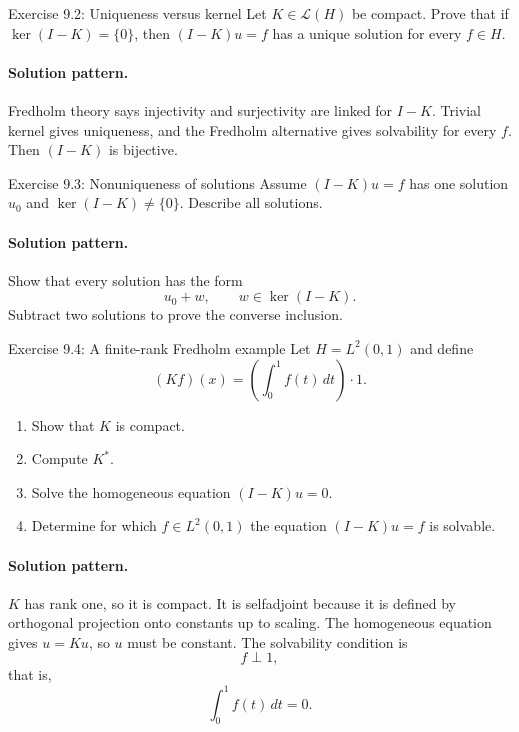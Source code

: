 \documentclass[header={Lecture 9 Exam Study Notes}]{study-note}
\begin{document}
\begin{exbox}{Exercise 9.2: Uniqueness versus kernel}
Let $K\in\mathcal L(H)$ be compact. Prove that if $\ker(I-K)=\{0\}$, then $(I-K)u=f$ has a unique solution for every $f\in H$.

\paragraph{Solution pattern.}
Fredholm theory says injectivity and surjectivity are linked for $I-K$. Trivial kernel gives uniqueness, and the Fredholm alternative gives solvability for every $f$. Then $(I-K)$ is bijective.
\end{exbox}

\begin{exbox}{Exercise 9.3: Nonuniqueness of solutions}
Assume $(I-K)u=f$ has one solution $u_0$ and $\ker(I-K)\neq\{0\}$. Describe all solutions.

\paragraph{Solution pattern.}
Show that every solution has the form
\[
u_0+w,
\qquad w\in\ker(I-K).
\]
Subtract two solutions to prove the converse inclusion.
\end{exbox}

\begin{exbox}{Exercise 9.4: A finite-rank Fredholm example}
Let $H=L^2(0,1)$ and define
\[
(Kf)(x)=\left(\int_0^1 f(t)\,dt\right)\cdot 1.
\]
\begin{enumerate}
\item Show that $K$ is compact.
\item Compute $K^*$.
\item Solve the homogeneous equation $(I-K)u=0$.
\item Determine for which $f\in L^2(0,1)$ the equation $(I-K)u=f$ is solvable.
\end{enumerate}

\paragraph{Solution pattern.}
$K$ has rank one, so it is compact. It is selfadjoint because it is defined by orthogonal projection onto constants up to scaling. The homogeneous equation gives $u=Ku$, so $u$ must be constant. The solvability condition is
\[
f\perp 1,
\]
that is,
\[
\int_0^1 f(t)\,dt=0.
\]
\end{exbox}
\end{document}
